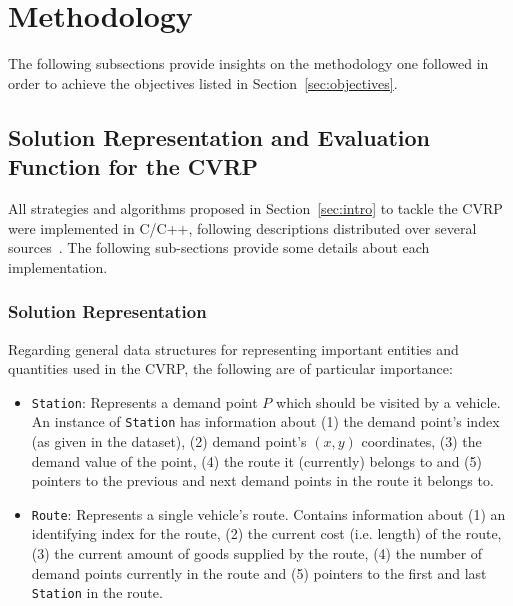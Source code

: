 \section{Methodology}
\label{sec:method}

The following subsections provide insights on the methodology one followed 
in order to achieve the objectives listed in Section~\ref{sec:objectives}.

\subsection{Solution Representation and Evaluation Function for the CVRP}
\label{subsec:spec-enti}

All strategies and algorithms proposed in Section~\ref{sec:intro} to tackle 
the CVRP were implemented in C\slash C++, following descriptions distributed 
over several sources~\cite{Toth2002, Michalewicz2004, Thangiahl1996, 
Psaraftis1983391, Osman1993}. 
The following sub-sections provide some details about each 
implementation.\vertbreak

\subsubsection{Solution Representation}
\label{subsubsec:sol-rep}

Regarding general data structures for representing important entities and 
quantities used in the CVRP, the following are of particular importance:

\begin{itemize}

    \item \verb?Station?: Represents a demand point $P$ which should be visited by 
            a vehicle. An instance of \verb?Station? has information about (1) the 
            demand point's index (as given in the dataset), (2) demand point's 
            $(x,y)$ coordinates, (3) the demand value of the point, (4) the 
            route it (currently) belongs to and (5) pointers to the previous and 
            next demand points in the route it belongs to.
    \item \verb?Route?: Represents a single vehicle's route. Contains 
            information about (1) an identifying index for the route, (2) the 
            current cost (i.e. length) of the route, (3) the 
            current amount of goods supplied 
            by the route, (4) the number of demand points currently in the 
            route and (5) pointers to the first and last \verb?Station? in the 
            route.
\end{itemize}\vertbreak

